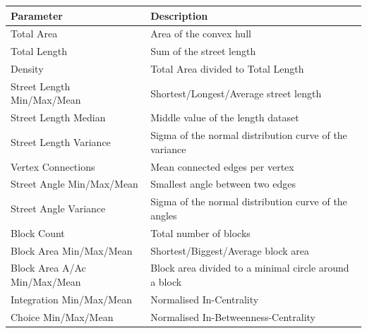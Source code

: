 \documentclass[11pt, a4paper]{report}
\begin{document}
\begin{center}
    \begin{tabular}{ | l | l |} \hline 
        Parameter & Description \\ 
        \hline
        Total Area &  Area of the convex hull \\ \hline
        Total Length & Sum of the street length \\ \hline
        Density & Total Area divided to Total Length  \\ \hline
        
        Street Length Min/Max/Mean & Shortest/Longest/Average street length  \\ \hline
        Street Length Median & Middle value of the length dataset \\ \hline
        Street Length Variance & Sigma of the normal distribution curve of the variance \\ \hline

        Vertex Connections & Mean connected edges per vertex  \\ \hline
        
        Street Angle Min/Max/Mean & Smallest angle between two edges \\ \hline
        Street Angle Variance & Sigma of the normal distribution curve of the angles \\ \hline
        
        Block Count & Total number of blocks \\ \hline
        Block Area Min/Max/Mean & Shortest/Biggest/Average block area \\ \hline
        Block Area A/Ac Min/Max/Mean & Block area divided to a minimal circle around a block \\ \hline
        
        Integration Min/Max/Mean & Normalised In-Centrality \\ \hline
        Choice Min/Max/Mean & Normalised In-Betweenness-Centrality \\ \hline
    \end{tabular}
\end{center}
\end{document}
